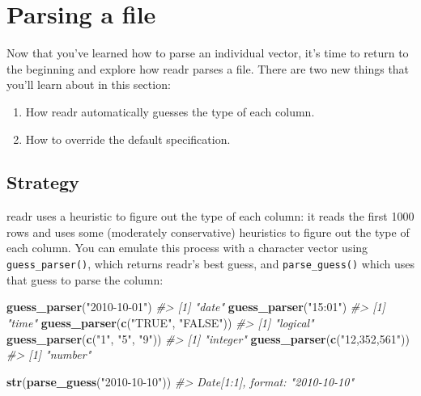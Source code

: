 \documentclass[]{book}
\newenvironment{Shaded}{\begin{snugshade}}{\end{snugshade}}
\newcommand{\KeywordTok}[1]{\textcolor[rgb]{0.13,0.29,0.53}{\textbf{{#1}}}}
\newcommand{\StringTok}[1]{\textcolor[rgb]{0.31,0.60,0.02}{{#1}}}
\newcommand{\CommentTok}[1]{\textcolor[rgb]{0.56,0.35,0.01}{\textit{{#1}}}}
\newcommand{\NormalTok}[1]{{#1}}
\providecommand{\tightlist}{%
  \setlength{\itemsep}{0pt}\setlength{\parskip}{0pt}}
\begin{document}
\hypertarget{parsing-a-file}{\section{Parsing a
file}\label{parsing-a-file}}

Now that you've learned how to parse an individual vector, it's time to
return to the beginning and explore how readr parses a file. There are
two new things that you'll learn about in this section:

\begin{enumerate}
\def\labelenumi{\arabic{enumi}.}
\tightlist
\item
  How readr automatically guesses the type of each column.
\item
  How to override the default specification.
\end{enumerate}

\subsection{Strategy}\label{strategy}

readr uses a heuristic to figure out the type of each column: it reads
the first 1000 rows and uses some (moderately conservative) heuristics
to figure out the type of each column. You can emulate this process with
a character vector using \texttt{guess\_parser()}, which returns readr's
best guess, and \texttt{parse\_guess()} which uses that guess to parse
the column:

\begin{Shaded}
\begin{Highlighting}[]
\KeywordTok{guess_parser}\NormalTok{(}\StringTok{"2010-10-01"}\NormalTok{)}
\CommentTok{#> [1] "date"}
\KeywordTok{guess_parser}\NormalTok{(}\StringTok{"15:01"}\NormalTok{)}
\CommentTok{#> [1] "time"}
\KeywordTok{guess_parser}\NormalTok{(}\KeywordTok{c}\NormalTok{(}\StringTok{"TRUE"}\NormalTok{, }\StringTok{"FALSE"}\NormalTok{))}
\CommentTok{#> [1] "logical"}
\KeywordTok{guess_parser}\NormalTok{(}\KeywordTok{c}\NormalTok{(}\StringTok{"1"}\NormalTok{, }\StringTok{"5"}\NormalTok{, }\StringTok{"9"}\NormalTok{))}
\CommentTok{#> [1] "integer"}
\KeywordTok{guess_parser}\NormalTok{(}\KeywordTok{c}\NormalTok{(}\StringTok{"12,352,561"}\NormalTok{))}
\CommentTok{#> [1] "number"}

\KeywordTok{str}\NormalTok{(}\KeywordTok{parse_guess}\NormalTok{(}\StringTok{"2010-10-10"}\NormalTok{))}
\CommentTok{#>  Date[1:1], format: "2010-10-10"}
\end{Highlighting}
\end{Shaded}
\end{document}
